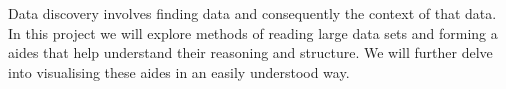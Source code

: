 {%
    Data discovery involves finding data and consequently the context of that data.
    In this project we will explore methods of reading large data sets and forming a aides that help understand their
    reasoning and structure.
    We will further delve into visualising these aides in an easily understood way.
}